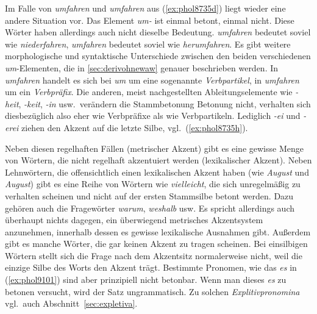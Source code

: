 Im Falle von \textit{\Akz umfahren} und \textit{um\Akz fahren} aus (\ref{ex:phol8735d}) liegt wieder eine andere Situation vor.
Das Element \textit{um-} ist einmal betont, einmal nicht.
Diese Wörter haben allerdings auch nicht dieselbe Bedeutung.
\textit{\Akz umfahren} bedeutet soviel wie \textit{niederfahren}, \textit{um\Akz fahren} bedeutet soviel wie \textit{herumfahren}.
Es gibt weitere morphologische und syntaktische Unterschiede zwischen den beiden verschiedenen \textit{um}-Elementen, die in \ref{sec:derivohnewaw} genauer beschrieben werden.
In \textit{\Akz umfahren} handelt es sich bei \textit{um} um eine sogenannte \textit{Verbpartikel}, in \textit{um\Akz fahren} um ein \textit{Verbpräfix}.
Die anderen, meist nachgestellten Ableitungselemente wie \textit{-heit}, \textit{-keit}, \textit{-in} usw.\ verändern die Stammbetonung Betonung nicht, verhalten sich diesbezüglich also eher wie Verbpräfixe als wie Verbpartikeln.
Lediglich \textit{-ei} und \textit{-erei} ziehen den Akzent auf die letzte Silbe, vgl.\ (\ref{ex:phol8735h}).


Neben diesen regelhaften Fällen (metrischer Akzent) gibt es eine gewisse Menge von Wörtern, die nicht regelhaft akzentuiert werden (lexikalischer Akzent).
Neben Lehnwörtern, die offensichtlich einen lexikalischen Akzent haben (wie \textit{\Akz August} und \textit{Au\Akz gust}) gibt es eine Reihe von Wörtern wie \textit{vie\Akz lleicht}, die sich unregelmäßig zu verhalten scheinen und nicht auf der ersten Stammsilbe betont werden.
Dazu gehören auch die Fragewörter \textit{wa\Akz rum}, \textit{wes\Akz halb} usw.
Es spricht allerdings auch überhaupt nichts dagegen, ein überwiegend metrisches Akzentsystem anzunehmen, innerhalb dessen es gewisse lexikalische Ausnahmen gibt.
Außerdem gibt es manche Wörter, die gar keinen Akzent zu tragen scheinen.
Bei einsilbigen Wörtern stellt sich die Frage nach dem Akzentsitz normalerweise nicht, weil die einzige Silbe des Worts den Akzent trägt.
Bestimmte Pronomen, wie das \textit{es} in (\ref{ex:phol9101}) sind aber prinzipiell nicht betonbar.
Wenn man dieses \textit{es} zu betonen versucht, wird der Satz ungrammatisch.
Zu solchen \textit{Explitivpronomina} vgl.\ auch Abschnitt~\ref{sec:expletiva}.

\begin{exe}
  \ex\label{ex:phol9101}
  \begin{xlist}
  \end{xlist}
\end{exe}

